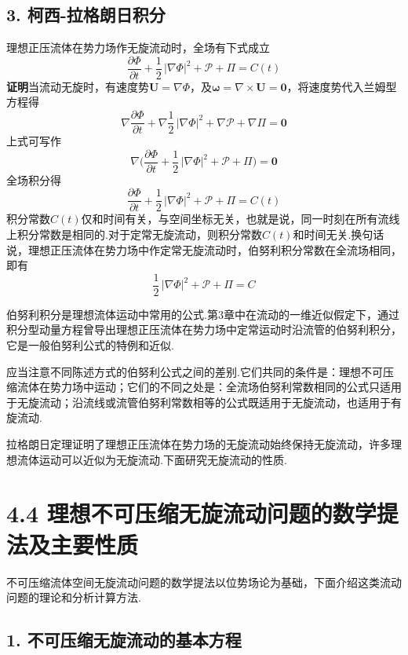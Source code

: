 \subsection*{3. 柯西-拉格朗日积分}

理想正压流体在势力场作无旋流动时，全场有下式成立
\begin{equation*}
\frac{\partial\Phi}{\partial t}+\frac{1}{2}\,|\nabla\Phi|^{2}+\mathscr{P}+\Pi=C(t)
\tag{4.27a}
\end{equation*}
\textbf{证明}\quad 当流动无旋时，有速度势$\boldsymbol{U}=\nabla\Phi$，及$\boldsymbol{\omega}=\nabla\times\boldsymbol{U}=\boldsymbol{0}$，将速度势代入兰姆型方程得
\[
\nabla\frac{\partial\Phi}{\partial t}+\nabla\frac{1}{2}\,|\nabla\Phi|^{2}+\nabla\mathscr{P}+\nabla\Pi=\boldsymbol{0}
\]
上式可写作
\[
\nabla\Big(\frac{\partial\Phi}{\partial t}+\frac{1}{2}\,|\nabla\Phi|^{2}+\mathscr{P}+\Pi\Big)=\boldsymbol{0}
\]
全场积分得
\[
\frac{\partial\Phi}{\partial t}+\frac{1}{2}\,|\nabla\Phi|^{2}+\mathscr{P}+\Pi=C(t)
\]
积分常数$C(t)$仅和时间有关，与空间坐标无关，也就是说，同一时刻在所有流线上积分常数是相同的.对于定常无旋流动，则积分常数$C(t)$和时间无关.换句话说，理想正压流体在势力场中作定常无旋流动时，伯努利积分常数在全流场相同，即有
\begin{equation*}
\frac{1}{2}\,|\nabla\Phi|^{2}+\mathscr{P}+\Pi=C
\tag{4.27b}
\end{equation*}

伯努利积分是理想流体运动中常用的公式.第3章中在流动的一维近似假定下，通过积分型动量方程曾导出理想正压流体在势力场中定常运动时沿流管的伯努利积分，它是一般伯努利公式的特例和近似.

应当注意不同陈述方式的伯努利公式之间的差别.它们共同的条件是：理想不可压缩流体在势力场中运动；它们的不同之处是：全流场伯努利常数相同的公式只适用于无旋流动；沿流线或流管伯努利常数相等的公式既适用于无旋流动，也适用于有旋流动.

拉格朗日定理证明了理想正压流体在势力场的无旋流动始终保持无旋流动，许多理想流体运动可以近似为无旋流动.下面研究无旋流动的性质.

\section*{4.4  理想不可压缩无旋流动问题的数学提法及主要性质}

不可压缩流体空间无旋流动问题的数学提法以位势场论为基础，下面介绍这类流动问题的理论和分析计算方法.

\subsection*{1. 不可压缩无旋流动的基本方程}

